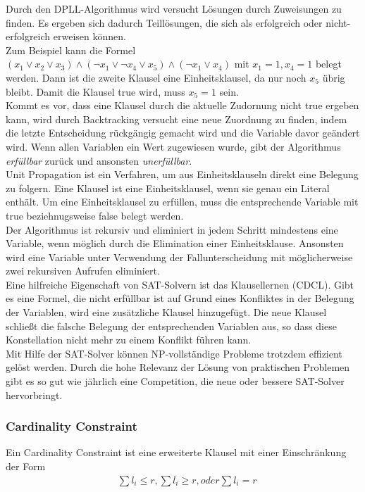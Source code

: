 \documentclass[a4,abstract=on]{scrartcl}
\begin{document}
Durch den DPLL-Algorithmus wird versucht Lösungen durch Zuweisungen zu finden. Es ergeben sich dadurch Teillösungen, die sich als erfolgreich oder nicht-erfolgreich erweisen können. \\
Zum Beispiel kann die Formel $(x_1 \vee x_2 \vee x_3) \wedge (\neg x_1 \vee \neg x_4 \vee x_5) \wedge (\neg x_1 \vee x_4)$ mit $x_1=1, x_4=1$ belegt werden. Dann ist die zweite Klausel eine Einheitsklausel, da nur noch $x_5$ übrig bleibt. Damit die Klausel true wird, muss $x_5 = 1$ sein. \\
Kommt es vor, dass eine Klausel durch die aktuelle Zudornung nicht true ergeben kann, wird durch Backtracking versucht eine neue Zuordnung zu finden, indem die letzte Entscheidung rückgängig gemacht wird und die Variable davor geändert wird. 
Wenn allen Variablen ein Wert zugewiesen wurde, gibt der Algorithmus \emph{erfüllbar} zurück und ansonsten \emph{unerfüllbar}.\\
Unit Propagation ist ein Verfahren, um aus Einheitsklauseln direkt eine Belegung zu folgern. Eine Klausel ist eine Einheitsklausel, wenn sie genau ein Literal enthält. Um eine Einheitsklausel zu erfüllen, muss die entsprechende Variable mit true beziehnugsweise false belegt werden.\\
Der Algorithmus ist rekursiv und eliminiert in jedem Schritt mindestens eine Variable, wenn möglich durch die Elimination einer Einheitsklause. Ansonsten wird eine Variable unter Verwendung der Fallunterscheidung mit möglicherweise zwei rekursiven Aufrufen eliminiert.\\
Eine hilfreiche Eigenschaft von SAT-Solvern ist das Klausellernen (CDCL). Gibt es eine Formel, die nicht erfüllbar ist auf Grund eines Konfliktes in der Belegung der Variablen, wird eine zusätzliche Klausel hinzugefügt. Die neue Klausel schließt die falsche Belegung der entsprechenden Variablen aus, so dass diese Konstellation nicht mehr zu einem Konflikt führen kann.\\
Mit Hilfe der SAT-Solver können NP-vollständige Probleme trotzdem effizient gelöst werden. Durch die hohe Relevanz der Lösung von praktischen Problemen gibt es so gut wie jährlich eine Competition, die neue oder bessere SAT-Solver hervorbringt.

\subsubsection{Cardinality Constraint}
Ein Cardinality Constraint \cite[vgl.][]{sinz} ist eine erweiterte Klausel mit einer Einschränkung der Form 
\begin{align*}
&\sum l_i \leq r, \sum l_i \geq r, oder \sum l_i = r
\end{align*}
\end{document}
